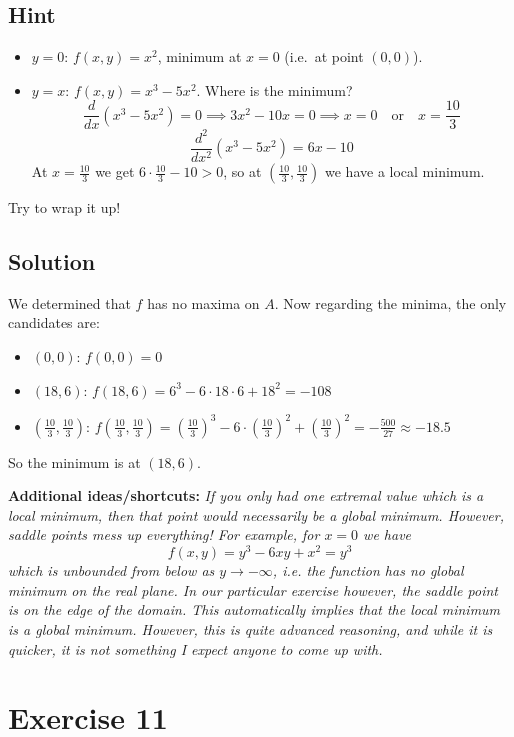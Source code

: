 \documentclass[a4paper,10pt]{article}
\begin{document}
\subsection{Hint}
\begin{itemize}
    \item $y=0$: $f(x,y) = x^2$, minimum at $x=0$ (i.e.\ at point $(0,0)$).
    \item $y=x$: $f(x,y) = x^3 - 5x^2$. Where is the minimum?
          \[
              \frac{d}{dx}(x^3 - 5x^2) = 0 \implies 3x^2 - 10x = 0 \implies x = 0 \quad \mathrm{or} \quad x = \frac{10}{3}
          \]
          \[
              \frac{d^2}{dx^2}(x^3 - 5x^2) = 6x - 10
          \]
          At $x = \frac{10}{3}$ we get $6\cdot\frac{10}{3} - 10 > 0$, so at $\left(\frac{10}{3}, \frac{10}{3}\right)$ we have a local minimum.
\end{itemize}
Try to wrap it up!

\subsection{Solution}
We determined that $f$ has no maxima on $A$. Now regarding the minima, the only candidates are:
\begin{itemize}
    \item $(0,0)$: $f(0,0) = 0$
    \item $(18, 6)$: $f(18, 6) = 6^3 - 6\cdot 18\cdot 6 + 18^2 = - 108$
    \item $\left(\frac{10}{3}, \frac{10}{3}\right)$: $f\left(\frac{10}{3}, \frac{10}{3}\right) = \left(\frac{10}{3}\right)^3 - 6\cdot \left(\frac{10}{3}\right)^2 + \left(\frac{10}{3}\right)^2 = -\frac{500}{27} \approx -18.5$
\end{itemize}
So the minimum is at $(18, 6)$.

\textbf{Additional ideas/shortcuts:} \emph{If you only had one extremal value which is a local minimum, then that point would necessarily be a global minimum. However, saddle points mess up everything! For example, for $x=0$ we have \[f(x,y) = y^3 - 6xy + x^2 = y^3\] which is unbounded from below as $y\to-\infty$, i.e. the function has no global minimum on the real plane. In our particular exercise however, the saddle point is on the edge of the domain. This automatically implies that the local minimum is a global minimum. However, this is quite advanced reasoning, and while it is quicker, it is not something I expect anyone to come up with.}

\clearpage

\section{Exercise 11}
\end{document}
